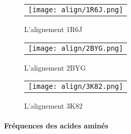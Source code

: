     \clearpage

   \begin{figure}[t]
     \centering
     \begin{tabular}{c}
       \texttt{[image: align/1R6J.png]} \\
     \end{tabular}
     \caption{L'alignement 1R6J }
\label{graph:convEref}
   \end{figure}

    \clearpage

   \begin{figure}[t]
     \centering
     \begin{tabular}{c}
       \texttt{[image: align/2BYG.png]} \\
     \end{tabular}
     \caption{L'alignement 2BYG }
\label{graph:convEref}
   \end{figure}

    \clearpage

   \begin{figure}[t]
     \centering
     \begin{tabular}{c}
       \texttt{[image: align/3K82.png]} \\
     \end{tabular}
     \caption{L'alignement 3K82 }
\label{graph:convEref}
   \end{figure}

    \clearpage




\paragraph{Fréquences des acides aminés}


